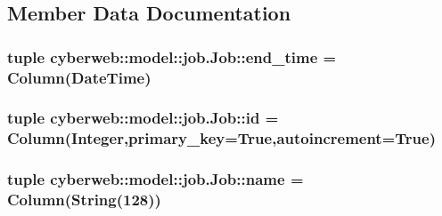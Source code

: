\subsection{\-Member \-Data \-Documentation}
\hypertarget{classcyberweb_1_1model_1_1job_1_1_job_acb11812580f3c6ef12c6ca493fa92c62}{
\subsubsection[{end\-\_\-time}]{\setlength{\rightskip}{0pt plus 5cm}tuple {\bf cyberweb\-::model\-::job.\-Job\-::end\-\_\-time} = \-Column(\-Date\-Time)}}\label{classcyberweb_1_1model_1_1job_1_1_job_acb11812580f3c6ef12c6ca493fa92c62}
\hypertarget{classcyberweb_1_1model_1_1job_1_1_job_a98bf1c7292121b428c1273b5ff4db97f}{
\subsubsection[{id}]{\setlength{\rightskip}{0pt plus 5cm}tuple {\bf cyberweb\-::model\-::job.\-Job\-::id} = \-Column(\-Integer,primary\-\_\-key=\-True,autoincrement=\-True)}}\label{classcyberweb_1_1model_1_1job_1_1_job_a98bf1c7292121b428c1273b5ff4db97f}
\hypertarget{classcyberweb_1_1model_1_1job_1_1_job_a348745d1266dbc6eeb03251e517a7b56}{
\subsubsection[{name}]{\setlength{\rightskip}{0pt plus 5cm}tuple {\bf cyberweb\-::model\-::job.\-Job\-::name} = \-Column(\-String(128))}}\label{classcyberweb_1_1model_1_1job_1_1_job_a348745d1266dbc6eeb03251e517a7b56}
\hypertarget{classcyberweb_1_1model_1_1job_1_1_job_ae6aef8282dec98dd18da1ed37018532c}{
\subsubsection[{name}]{}}\label{classcyberweb_1_1model_1_1job_1_1_job_ae6aef8282dec98dd18da1ed37018532c}
